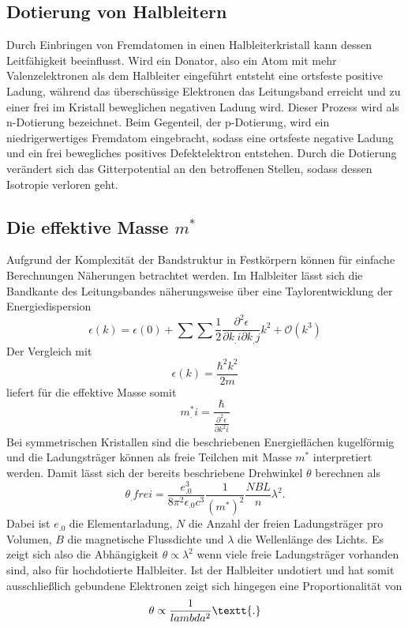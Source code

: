 \subsection{Dotierung von Halbleitern}
Durch Einbringen von Fremdatomen in einen Halbleiterkristall kann dessen Leitfähigkeit beeinflusst. Wird ein Donator, also ein Atom mit mehr Valenzelektronen als dem Halbleiter eingeführt entsteht eine ortsfeste positive Ladung, während das überschüssige Elektronen das Leitungsband erreicht und zu einer frei im Kristall beweglichen negativen Ladung wird. Dieser Prozess wird als n-Dotierung bezeichnet. Beim Gegenteil, der p-Dotierung, wird ein niedrigerwertiges Fremdatom eingebracht, sodass eine ortsfeste negative Ladung und ein frei bewegliches positives Defektelektron entstehen. Durch die Dotierung verändert sich das Gitterpotential an den betroffenen Stellen, sodass dessen Isotropie verloren geht.

\subsection{Die effektive Masse $m^*$}
Aufgrund der Komplexität der Bandstruktur in Festkörpern können für einfache Berechnungen Näherungen betrachtet werden.
Im Halbleiter lässt sich die Bandkante des Leitungsbandes näherungsweise über eine Taylorentwicklung der Energiedispersion
\begin{equation*}
\epsilon(k) = \epsilon(0) + \sum\sum\frac{1}{2}\frac{\partial^2\epsilon}{\partial k_.i\partial k_.j}k^2 + \mathcal{O}(k^3)
\end{equation*}
Der Vergleich mit
\[
\epsilon(k) = \frac{\hbar^2k^2}{2m}
\]
liefert für die effektive Masse somit
\begin{equation}
m^*_.i = \frac{\hbar}{\frac{\partial^2\epsilon}{\partial k^2_.i}}\label{eq:mstar}
\end{equation}
Bei symmetrischen Kristallen sind die beschriebenen Energieflächen kugelförmig und die Ladungsträger können als freie Teilchen mit Masse $m^*$ interpretiert werden.
Damit lässt sich der bereits beschriebene Drehwinkel $\theta$ berechnen als
\begin{equation}
\theta_.{frei} = \frac{e^3_.0}{8\pi^2\epsilon_.0c^3}\frac{1}{(m^*)^2}\frac{NBL}{n}\lambda^2\text{.}\label{eq:theta2}
\end{equation}
Dabei ist $e_.0$ die Elementarladung, $N$ die Anzahl der freien Ladungsträger pro Volumen, $B$ die magnetische Flussdichte und $\lambda$ die Wellenlänge des Lichts.
Es zeigt sich also die Abhängigkeit $\theta\propto \lambda^2$ wenn viele freie Ladungsträger vorhanden sind, also für hochdotierte Halbleiter. Ist der Halbleiter undotiert und hat somit ausschließlich gebundene Elektronen zeigt sich hingegen eine Proportionalität von
\begin{equation}
\theta\propto\frac{1}{lambda^2}\textt{.}\label{eq:theta3}
\end{equation}



